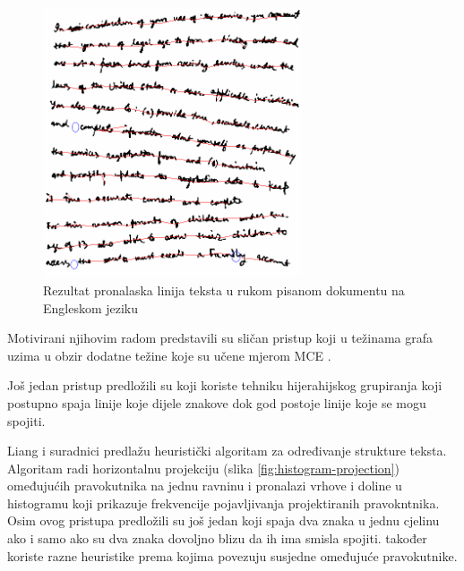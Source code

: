 \documentclass[times, utf8, zavrsni]{fer}
\begin{document}
\begin{figure}[htb]
    \centering
    \captionsetup{justification=centering,margin=2cm}
    \includegraphics[height=8cm]{images/mst-example-01.png}
    \caption{
        Rezultat pronalaska linija teksta u rukom pisanom dokumentu na
        Engleskom jeziku \citep{yin2007handwritten}
    }
    \label{fig:mst-example-01}
\end{figure}

Motivirani njihovim radom \citep{pan2011hybrid} predstavili su sličan pristup
koji u težinama grafa uzima u obzir dodatne težine koje su učene mjerom MCE
.

Još jedan pristup predložili su \citep{DBLP:journals/corr/abs-1301-2628} koji
koriste tehniku hijerahijskog grupiranja koji postupno spaja linije koje dijele
znakove dok god postoje linije koje se mogu spojiti.
\citep{DBLP:journals/corr/TianPHLYT16}

Liang i suradnici \citep{liang1996document} predlažu heuristički algoritam za
određivanje strukture teksta. Algoritam radi horizontalnu projekciju (slika
\ref{fig:histogram-projection}) omeđujućih pravokutnika na jednu ravninu i
pronalazi vrhove i doline u histogramu koji prikazuje frekvencije pojavljivanja
projektiranih pravokntnika. Osim ovog pristupa predložili su još jedan koji
spaja dva znaka u jednu cjelinu ako i samo ako su dva znaka dovoljno blizu da
ih ima smisla spojiti. \citep{gupta2006document} također
koriste razne heuristike prema kojima povezuju susjedne omeđujuće pravokutnike.
\end{document}
